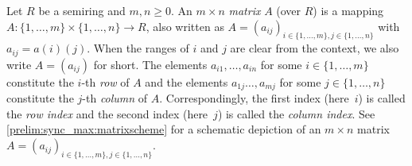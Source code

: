 Let $R$ be a semiring and $m,n\ge 0$.
An $m \times n$ \emph{matrix} $A$  (over $R$) is  \label{def:matrix}
a mapping~$A \colon \{1,\ldots,m\} \times \{1,\ldots,n\} \to R$, 
also written as $A = (a_{ij})_{i \in \{1,\ldots,m\}, j \in \{1,\ldots,n\}}$
with $a_{ij} = a(i)(j)$.
When the ranges of $i$ and $j$ are clear from the context,
we also write $A = (a_{ij})$ for short. 
The elements $a_{i1}, \ldots, a_{in}$ for some $i \in \{1,\ldots,m\}$ constitute
the $i$-th \emph{row} of $A$ 
and the elements $a_{1j} \ldots, a_{mj}$ for some $j \in \{1,\ldots,n\}$ constitute
the $j$-th \emph{column} of $A$. 
Correspondingly, the first index (here~$i$) is called the \emph{row index} 
and the second index (here~$j$) is called the \emph{column index}. 
See \cref{prelim:sync_max:matrixscheme} for a schematic depiction of an $m \times n$ matrix $A = (a_{ij})_{i\in \{1,\ldots,m\}, j\in \{1,\ldots,n\}}$.

